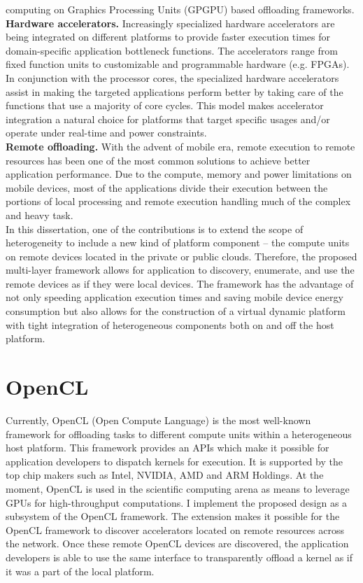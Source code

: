 computing on Graphics Processing Units (GPGPU) based offloading
frameworks.\\
{\bf Hardware accelerators.}
Increasingly specialized hardware accelerators are being integrated on
different platforms to provide faster execution times for
domain-specific application bottleneck functions.
%
The accelerators range from fixed function units to customizable and
programmable hardware (e.g. FPGAs).
%
In conjunction with the processor cores, the specialized hardware
accelerators assist in making the targeted applications perform better
by taking care of the functions that use a majority of core cycles.
%
This model makes accelerator integration a natural choice for platforms
that target specific usages and/or operate under real-time and power
constraints.\\
%
{\bf Remote offloading.}
%
With the advent of mobile era, remote execution to remote resources has
been one of the most common solutions to achieve better application
performance.
%
Due to the compute, memory and power limitations on mobile devices, most
of the applications divide their execution between the portions of local
processing and remote execution handling much of the complex and heavy
task.\\
%
%
In this dissertation, one of the contributions is to extend the scope
of heterogeneity to include a new kind of platform component -- the
compute units on remote devices located in the private or public clouds.
%
Therefore, the proposed multi-layer framework allows for application to
discovery, enumerate, and use the remote devices as if they were local
devices.
%
The framework has the advantage of not only speeding application
execution times and saving mobile device energy consumption but also
allows for the construction of a virtual dynamic platform with tight
integration of heterogeneous components both on and off the host
platform.
%
\section{OpenCL}
\label{back:opencl}
%
Currently, OpenCL (Open Compute Language) is the most well-known
framework for offloading tasks to different compute units within a
heterogeneous host platform.
%
This framework provides an APIs which make it possible for application
developers to dispatch kernels for execution.
%
It is supported by the top chip makers such as Intel, NVIDIA, AMD and
ARM Holdings.
%
At the moment, OpenCL is used in the scientific computing arena as means
to leverage GPUs for high-throughput computations.
%
I implement the proposed design as a subsystem of the OpenCL framework.
%
The extension makes it possible for the OpenCL framework to discover
accelerators located on remote resources across the network.
%
Once these remote OpenCL devices are discovered, the application
developers is able to use the same interface to transparently offload a
kernel as if it was a part of the local platform.
%
